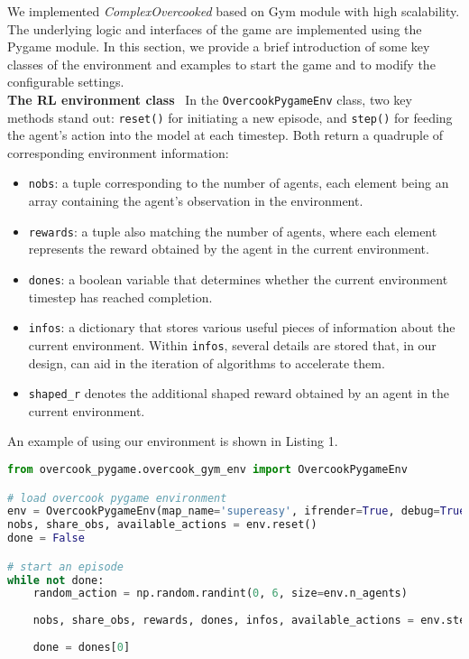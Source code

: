 We implemented \textit{ComplexOvercooked} based on Gym module with high scalability. The underlying logic and interfaces of the game are implemented using the Pygame module. In this section, we provide a brief introduction of some key classes of the environment and examples to start the game and to modify the configurable settings.\\
\textbf{The RL environment class}  \ In the \texttt{OvercookPygameEnv} class, two key methods stand out:  \texttt{reset()} for initiating a new episode, and \texttt{step()} for feeding the agent's action into the model at each timestep. Both return a quadruple of corresponding environment information:
\begin{itemize}
\item \texttt{nobs}: a tuple corresponding to the number of agents, each element being an array containing the agent's observation in the environment.
\item \texttt{rewards}: a tuple also matching the number of agents, where each element represents the reward obtained by the agent in the current environment.
\item \texttt{dones}: a boolean variable that determines whether the current environment timestep has reached completion.
\item \texttt{infos}: a dictionary that stores various useful pieces of information about the current environment. Within \texttt{infos}, several details are stored that, in our design, can aid in the iteration of algorithms to accelerate them. 
\item \texttt{shaped\_r} denotes the additional shaped reward obtained by an agent in the current environment. 

\end{itemize}
An example of using our environment is shown in Listing 1.
\begin{lstlisting}[language=Python, caption=Python example to start the game engine, label=code:example1]
from overcook_pygame.overcook_gym_env import OvercookPygameEnv

# load overcook pygame environment
env = OvercookPygameEnv(map_name='supereasy', ifrender=True, debug=True)
nobs, share_obs, available_actions = env.reset()
done = False

# start an episode
while not done:
    random_action = np.random.randint(0, 6, size=env.n_agents)
    
    nobs, share_obs, rewards, dones, infos, available_actions = env.step(random_action)
    
    done = dones[0]
\end{lstlisting}\\
